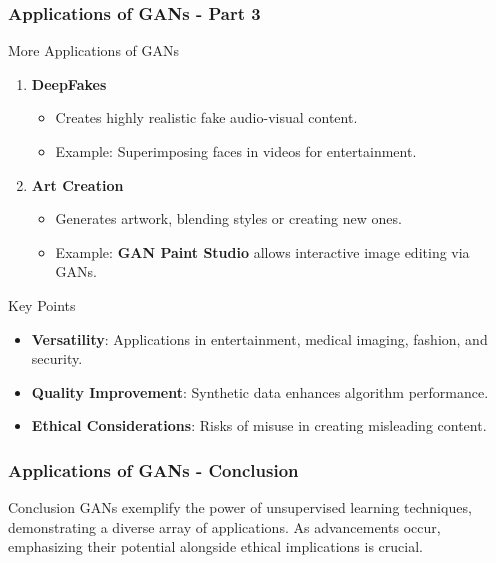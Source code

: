 \documentclass[aspectratio=169]{beamer}
\begin{document}
\begin{frame}[fragile]
    \frametitle{Applications of GANs - Part 3}
    \begin{block}{More Applications of GANs}
        \begin{enumerate}[resume]
            \item \textbf{DeepFakes}
                \begin{itemize}
                    \item Creates highly realistic fake audio-visual content.
                    \item Example: Superimposing faces in videos for entertainment.
                \end{itemize}
            \item \textbf{Art Creation}
                \begin{itemize}
                    \item Generates artwork, blending styles or creating new ones.
                    \item Example: \textbf{GAN Paint Studio} allows interactive image editing via GANs.
                \end{itemize}
        \end{enumerate}
    \end{block}
    \begin{block}{Key Points}
        \begin{itemize}
            \item \textbf{Versatility}: Applications in entertainment, medical imaging, fashion, and security.
            \item \textbf{Quality Improvement}: Synthetic data enhances algorithm performance.
            \item \textbf{Ethical Considerations}: Risks of misuse in creating misleading content.
        \end{itemize}
    \end{block}
\end{frame}

\begin{frame}[fragile]
    \frametitle{Applications of GANs - Conclusion}
    \begin{block}{Conclusion}
        GANs exemplify the power of unsupervised learning techniques, demonstrating a diverse array of applications. As advancements occur, emphasizing their potential alongside ethical implications is crucial.
    \end{block}
\end{frame}
\end{document}

